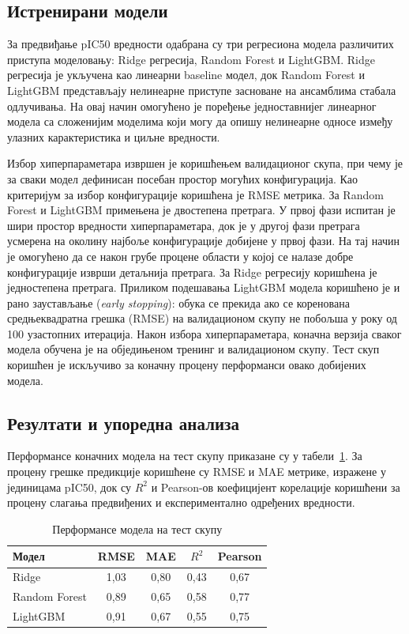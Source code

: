 \documentclass[12pt,oneside]{memoir}
\begin{document}
\subsection{Истренирани модели}
\label{sec:predictive-models}

За предвиђање pIC50 вредности одабрана су три регресиона модела различитих 
приступа моделовању: Ridge регресија, Random Forest и LightGBM. 
Ridge регресија је укључена као линеарни baseline модел, док Random Forest 
и LightGBM представљају нелинеарне приступе засноване на ансамблима стабала 
одлучивања. На овај начин омогућено је поређење једноставнијег линеарног 
модела са сложенијим моделима који могу да опишу нелинеарне односе између 
улазних карактеристика и циљне вредности.

Избор хиперпараметара извршен је коришћењем валидационог скупа, при чему 
је за сваки модел дефинисан посебан простор могућих конфигурација. 
Као критеријум за избор конфигурације коришћена је RMSE метрика. 
За Random Forest и LightGBM примењена је двостепена претрага. У првој фази
испитан је шири простор вредности хиперпараметара, док је у другој фази 
претрага усмерена на околину најбоље конфигурације добијене у првој фази. 
На тај начин је омогућено да се након грубе процене области у којој се 
налазе добре конфигурације изврши детаљнија претрага. За Ridge регресију 
коришћена је једностепена претрага.
Приликом подешавања LightGBM модела коришћено је и рано заустављање 
(\textit{early stopping}): обука се прекида ако се коренована средњеквадратна 
грешка (RMSE) на валидационом скупу не побољша у року од 100 узастопних итерација.
Након избора хиперпараметара, коначна верзија сваког модела обучена је 
на обједињеном тренинг и валидационом скупу. Тест скуп коришћен 
је искључиво за коначну процену перформанси овако добијених модела.

\subsection{Резултати и упоредна анализа}
\label{sec:model-results}

Перформансе коначних модела на тест скупу приказане су у табели~\ref{tab:model-results}. За процену грешке предикције коришћене су RMSE и MAE метрике, изражене у јединицама pIC50, док су $R^2$ и Pearson-ов коефицијент корелације коришћени за процену слагања предвиђених и експериментално одређених вредности.

\begin{table}[!ht]
  \centering
  \begin{tabular}{lcccc}
    \toprule
    \textbf{Модел} & \textbf{RMSE} & \textbf{MAE} & \textbf{$R^2$} & \textbf{Pearson} \\
    \midrule
    Ridge           & 1{,}03 & 0{,}80 & 0{,}43 & 0{,}67 \\
    Random Forest   & 0{,}89 & 0{,}65 & 0{,}58 & 0{,}77 \\
    LightGBM        & 0{,}91 & 0{,}67 & 0{,}55 & 0{,}75 \\
    \bottomrule
  \end{tabular}
  \caption{Перформансе модела на тест скупу}
  \label{tab:model-results}
\end{table}
\end{document}
